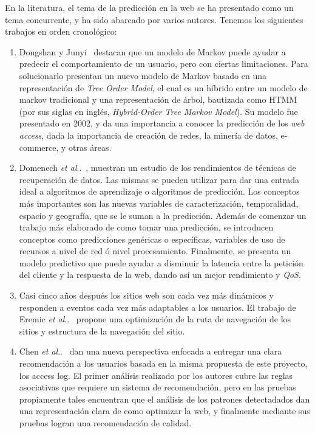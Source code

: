 \documentclass{udparticle}
\makeatletter
\DeclareRobustCommand\onedot{\futurelet\@let@token\@onedot}
\newcommand\@onedot{\ifx\@let@token.\else.\null\fi\xspace}
\newcommand\etal{\emph{et al}\onedot}
\makeatother
\begin{document}
En la literatura, el tema de la predicción en la web se ha presentado como un tema concurrente, y ha sido abarcado por varios autores. 
Tenemos los siguientes trabajos en orden cronológico:

\begin{enumerate}
  \item Dongshan y Junyi~\cite{tmmd} destacan que un modelo de Markov puede ayudar a predecir el comportamiento de un usuario, pero con ciertas limitaciones.
  Para solucionarlo presentan un nuevo modelo de Markov basado en una representación de \emph{Tree Order Model}, el cual es un híbrido entre un modelo de markov tradicional y una representación de árbol, bautizada como HTMM (por sus siglas en inglés, \emph{Hybrid-Order Tree Markov Model}).
  Su modelo fue presentado en 2002, y da una importancia a conocer la predicción de los \emph{web access}, dada la importancia de creación de redes, la minería de datos, e-commerce, y otras áreas.

  \item Domenech \etal~\cite{domenech}, muestran un estudio de los rendimientos de técnicas de recuperación de datos.
  Las mismas se pueden utilizar para dar una entrada ideal a algoritmos de aprendizaje o algoritmos de predicción. 
  Los conceptos más importantes son las nuevas variables de caracterización, temporalidad, espacio y geografía, que se le suman a la predicción. 
  Además de comenzar un trabajo más elaborado de como tomar una predicción, se introducen conceptos como predicciones genéricas o específicas, variables de uso de recursos a nivel de red ó nivel procesamiento.
  Finalmente, se presenta un modelo predictivo que puede ayudar a disminuir la latencia entre la petición del cliente y la respuesta de la web, dando así un mejor rendimiento y \emph{QoS}.

  \item Casi cinco años después los sitios web son cada vez más dinámicos y responden a eventos cada vez más adaptables a los usuarios. 
  El trabajo de Eremic \etal~\cite{Dragica2010} propone una optimización de la ruta de navegación de los sitios y estructura de la navegación del sitio. 

  \item Chen \etal~\cite{yuhua2011} dan una nueva perspectiva enfocada a entregar una clara recomendación a los usuarios basada en la misma propuesta de este proyecto, los access log.
  El primer análisis realizado por los autores cubre las reglas asociativas que requiere un sistema de recomendación, pero en las pruebas propiamente tales encuentran que el análisis de los patrones detectadados dan una representación clara de como optimizar la web, y finalmente mediante sus pruebas logran una recomendación de calidad.


\end{enumerate}
\end{document}

